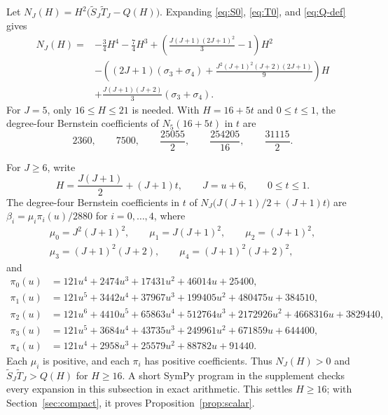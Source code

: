 \documentclass[ECP,preprint]{ejpecp}
\begin{document}
Let $N_J(H)=H^2\bigl(\tilde S_J\tilde T_J-Q(H)\bigr)$. Expanding
\eqref{eq:S0}, \eqref{eq:T0}, and \eqref{eq:Q-def} gives
\begin{align*}
  N_J(H)={}&-\frac34H^4-\frac74H^3
  +\left(\frac{J(J+1)(2J+1)^2}{3}-1\right)H^2\\
  &-\left((2J+1)(\sigma_3+\sigma_4)
    +\frac{J^2(J+1)^2(J+2)(2J+1)}{9}\right)H\\
  &+\frac{J(J+1)(J+2)}{3}(\sigma_3+\sigma_4).
\end{align*}
For $J=5$, only $16\leq H\leq21$ is needed. With $H=16+5t$ and
$0\leq t\leq1$, the degree-four Bernstein coefficients of $N_5(16+5t)$ in $t$
are
\[
  2360,\qquad 7500,\qquad \frac{25055}{2},\qquad
  \frac{254205}{16},\qquad \frac{31115}{2}.
\]

For $J\geq6$, write
\[
  H=\frac{J(J+1)}2+(J+1)t,
  \qquad J=u+6,
  \qquad 0\leq t\leq1.
\]
The degree-four Bernstein coefficients in $t$ of
$N_J\bigl(J(J+1)/2+(J+1)t\bigr)$ are $\beta_i=\mu_i\pi_i(u)/2880$ for
$i=0,\ldots,4$, where
\[
  \begin{gathered}
    \mu_0=J^2(J+1)^2,\qquad \mu_1=J(J+1)^2,\qquad \mu_2=(J+1)^2,\\
    \mu_3=(J+1)^2(J+2),\qquad \mu_4=(J+1)^2(J+2)^2,
  \end{gathered}
\]
and
\begin{align*}
  \pi_0(u)&=121u^4+2474u^3+17431u^2+46014u+25400,\\
  \pi_1(u)&=121u^5+3442u^4+37967u^3+199405u^2+480475u+384510,\\
  \pi_2(u)&=121u^6+4410u^5+65863u^4+512764u^3
    +2172926u^2+4668316u+3829440,\\
  \pi_3(u)&=121u^5+3684u^4+43735u^3+249961u^2+671859u+644400,\\
  \pi_4(u)&=121u^4+2958u^3+25579u^2+88782u+91440.
\end{align*}
Each $\mu_i$ is positive, and each $\pi_i$ has positive coefficients. Thus
$N_J(H)>0$ and $\tilde S_J\tilde T_J>Q(H)$ for $H\geq16$. A short SymPy
program in the supplement checks every expansion in this subsection in exact
arithmetic. This settles $H\geq16$; with Section~\ref{sec:compact}, it
proves Proposition~\ref{prop:scalar}.
\end{document}
